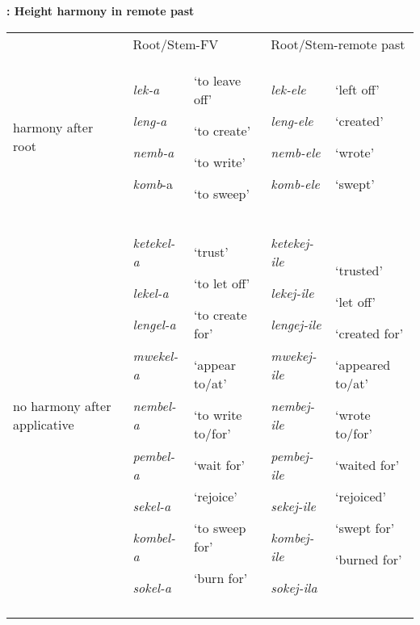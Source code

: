 \documentclass[output=paper]{langsci/langscibook}
\begin{document}
\textbf{: Height harmony in remote past}


\begin{tabularx}{\textwidth}{XXXXX} & \multicolumn{2}{l}{Root/Stem-FV} & \multicolumn{2}{l}{Root/Stem-remote past}\\
\lsptoprule
harmony after root & {\emph{lek-a}}

{\emph{leng-a}}

{\emph{nemb-a  }}

{\emph{komb}{}-a} & {‘to leave off’}

{‘to create’}

{‘to write’}

{‘to sweep’} & {\emph{lek-ele}}

{\emph{leng-ele}}

{\emph{nemb-ele}}

{\emph{komb-ele}} & {‘left off’}

{‘created’}

{‘wrote’}

{‘swept’}\\
no harmony after applicative & {\emph{ketekel-a}}

{\emph{lekel-a}}

{\emph{lengel-a}}

{\emph{mwekel-a}}

{\emph{nembel-a}}

{\emph{pembel-a}}

{\emph{sekel-a}}

{\emph{kombel-a}}

\emph{sokel-a} & {‘trust’}

{‘to let off’}

{‘to create for’}

{‘appear to/at’}

{‘to write to/for’}

{‘wait for’}

{‘rejoice’}

{‘to sweep for’}

‘burn for’ & {\emph{ketekej-ile}}

{\emph{lekej-ile}}

{\emph{lengej-ile}}

{\emph{mwekej-ile}}

{\emph{nembej-ile}}

{\emph{pembej-ile}}

{\emph{sekej-ile}}

{\emph{kombej-ile}}

\emph{sokej-ila} & {‘trusted’}

{‘let off’}

{‘created for’}

{‘appeared to/at’}

{‘wrote to/for’}

{‘waited for’}

{‘rejoiced’}

{‘swept for’}

‘burned for’\\
\lspbottomrule
\end{tabularx}
\end{document}
